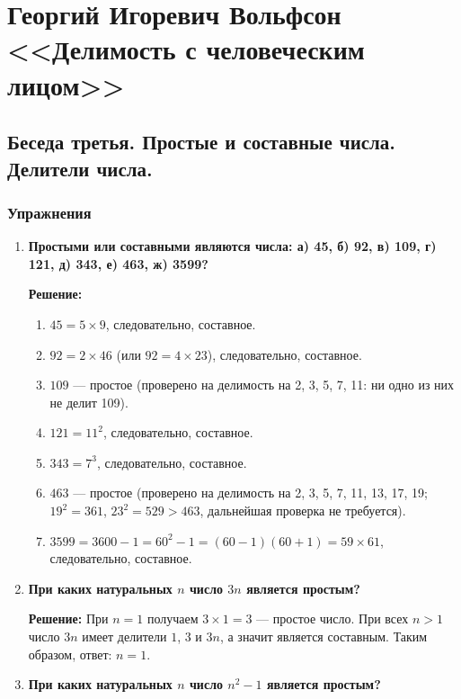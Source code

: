 \documentclass[12pt, a4paper]{article}
\begin{document}
\section*{Георгий Игоревич Вольфсон <<Делимость с человеческим лицом>>}

\subsection*{Беседа третья. Простые и составные числа. Делители числа.}

\subsubsection*{Упражнения}

\begin{enumerate}[label=\arabic*., wide=0pt, leftmargin=*]

\item \textbf{Простыми или составными являются числа: а) 45, б) 92, в) 109, г) 121, д) 343, е) 463, ж) 3599?}

\textbf{Решение:}
\begin{enumerate}[label=\alph*), wide=0pt, leftmargin=*]
\item $45 = 5 \times 9$, следовательно, составное.
\item $92 = 2 \times 46$ (или $92 = 4 \times 23$), следовательно, составное.
\item $109$ — простое (проверено на делимость на 2, 3, 5, 7, 11: ни одно из них не делит 109).
\item $121 = 11^2$, следовательно, составное.
\item $343 = 7^3$, следовательно, составное.
\item $463$ — простое (проверено на делимость на 2, 3, 5, 7, 11, 13, 17, 19; $19^2 = 361$, $23^2 = 529 > 463$, дальнейшая проверка не требуется).
\item $3599 = 3600 - 1 = 60^2 - 1 = (60-1)(60+1) = 59 \times 61$, следовательно, составное.
\end{enumerate}

\item \textbf{При каких натуральных $n$ число $3n$ является простым?}

\textbf{Решение:} 
При $n = 1$ получаем $3 \times 1 = 3$ — простое число. 
При всех $n > 1$ число $3n$ имеет делители $1$, $3$ и $3n$, а значит является составным. 
Таким образом, ответ: $n = 1$.

\item \textbf{При каких натуральных $n$ число $n^2 - 1$ является простым?}


\end{enumerate}
\end{document}
